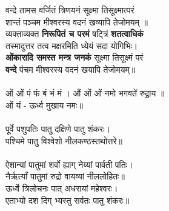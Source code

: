 वन्दे तामस वर्जितं त्रिणयनं सूक्ष्मा तिसूक्ष्मात्परं\\
शान्तं पञ्चम मीश्वरस्य वदनं खव्यापि तेजोमयम् ॥\\
{\small
व्यक्ताव्यक्त \textbf{निरूपितं च परमं} षट्त्रिं \textbf{शतत्वाधिकं}\\
तस्मादुत्तर तत्व मक्षरमिति ध्येयं सदा योगिभिः।\\
\textbf{ओंकारादि समस्त मन्त्र जनकं} सूक्ष्मा तिसूक्ष्मं परं\\
\textbf{वन्दे} पंचम मीश्वरस्य वदनं खयापि तेजोमयम्॥\\
}
\\
ओं ओं पं फं बं भं मं । औं ओं ओं नमो भगवते॑ रुद्रा॒य ॥\\
ओं यं - ऊर्ध्व मुखाय नमः॥\\
\\
पूर्वे पशुपतिः पातु दक्षिणे पातु शंकरः।\\
पश्चिमे पातु विश्वेशो नीलकण्ठस्तथोत्तरे॥\\
\\
ऐशान्यां पातुमां शर्वो ह्याग् नेय्यां पार्वती पतिः।\\
नैर्ऋर्त्यां पातुमां रुद्रो वायव्यां नीललोहितः॥\\
ऊर्ध्वे त्रिलोचनः पात् अधरायां महेश्वरः।\\
एताभ्यो दश दिग् भ्यस्तु सर्वतः पातु शंकरः॥\\
